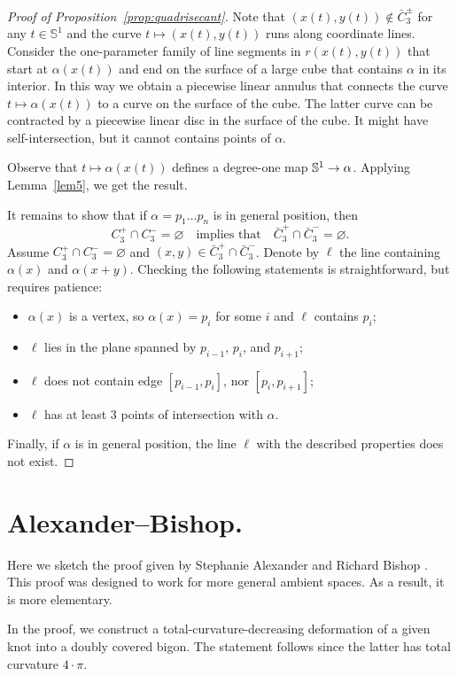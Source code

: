 \documentclass{article}
\newcommand*{\arXiv}[2]{#1} %
\newcommand*{\z}[1]{#1\nobreak\discretionary{}%
            {\hbox{$\mathsurround=0pt #1$}}{}}
\theoremstyle{theorem}
\newtheorem{Crofton-type formula}[theorem]{Crofton-type formula}
\newtheorem{Douglas--Rado theorem}[theorem]{\arXiv{Douglas--Rado theorem}{Theorem}}
\newtheorem{Extended monotonicity theorem}[theorem]{\arXiv{Extended monotonicity theorem}{Theorem}}
\theoremstyle{definition}
\def\emptyset{\varnothing}
\begin{document}
\begin{proof}[Proof of Proposition~\ref{prop:quadrisecant}]
Note that $(x(t),y(t))\notin \bar C_3^\pm$ for any $t\in \mathbb{S}^1$ and the curve $t\mapsto(x(t),y(t))$ runs along coordinate lines.
Consider the one-parameter family of line segments in $r(x(t),y(t))$ that start at $\alpha(x(t))$ and end on the surface of a large cube that contains $\alpha$ in its interior.
In this way we obtain a piecewise linear annulus that connects the curve $t\mapsto \alpha(x(t))$ to a curve on the surface of the cube.
The latter curve can be contracted by a piecewise linear disc in the surface of the cube.
It might have self-intersection, but it cannot contains points of $\alpha$.

Observe that $t\mapsto \alpha(x(t))$ defines a degree-one map $\mathbb{S}^1\z\to\alpha$.
Applying Lemma~\ref{lem5}, we get the result.

It remains to show that if $\alpha=p_1\dots p_n$ is in general position, then
\[C_3^+\cap C_3^-=\emptyset\quad\text{implies that}\quad
\bar C_3^+\cap \bar C_3^-=\emptyset.\]
Assume $C_3^+\cap C_3^-=\emptyset$ and $(x,y)\in \bar C_3^+\cap \bar C_3^-$.
Denote by $\ell$ the line containing $\alpha(x)$ and $\alpha(x+y)$.
Checking the following statements is straightforward, but requires patience:
\begin{itemize}
 \item $\alpha(x)$ is a vertex, so $\alpha(x)=p_i$ for some $i$ and $\ell$ contains $p_i$;
 \item $\ell$ lies in the plane spanned by $p_{i-1}$, $p_i$, and $p_{i+1}$; 
 \item $\ell$ does not contain edge $[p_{i-1}, p_i]$, nor $[p_{i}, p_{i+1}]$;
 \item $\ell$ has at least 3 points of intersection with $\alpha$.
\end{itemize}
Finally, if $\alpha$ is in general position,
the line $\ell$ with the described properties does not exist.
\end{proof}

\section{Alexander--Bishop.}

Here we sketch the proof given by Stephanie Alexander and Richard Bishop \cite{alexander-bishop}.
This proof was designed to work for more general ambient spaces.
As a result, it is more elementary.

In the proof, we construct a total-curvature-decreasing deformation of a given knot into a doubly covered
bigon.
The statement follows since the latter has total curvature $4\arXiv{{\cdot}}{}\pi$.
\end{document}

